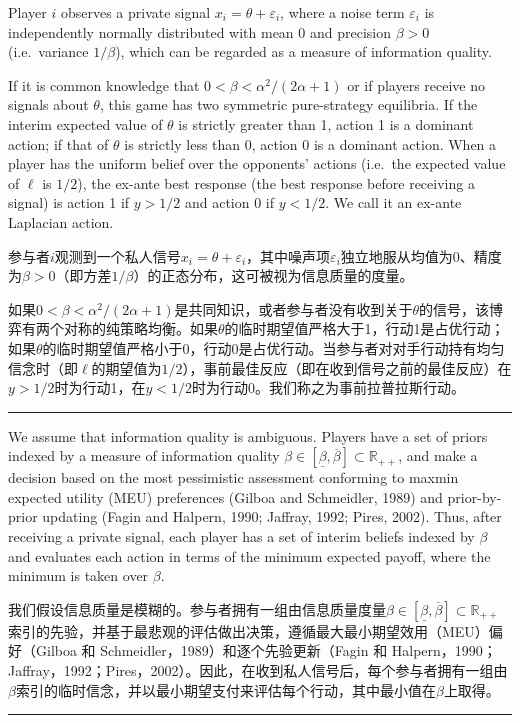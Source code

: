 \documentclass[12pt,a4paper]{article}
\newenvironment{original}
  {\par\medskip\noindent\color{black}\ignorespaces}
  {\par\medskip}
\newenvironment{translation}
  {\par\noindent\color{darkblue}\ignorespaces}
  {\par\medskip\noindent\hrule\par\medskip}
\theoremstyle{definition}
\theoremstyle{remark}
\begin{document}
\begin{original}
Player $i$ observes a private signal $x_i = \theta + \varepsilon_i$, where a noise term $\varepsilon_i$ is independently normally distributed with mean 0 and precision $\beta > 0$ (i.e.\ variance $1/\beta$), which can be regarded as a measure of information quality.

If it is common knowledge that $0 < \beta < \alpha^2/(2\alpha + 1)$ or if players receive no signals about $\theta$, this game has two symmetric pure-strategy equilibria. If the interim expected value of $\theta$ is strictly greater than 1, action 1 is a dominant action; if that of $\theta$ is strictly less than 0, action 0 is a dominant action. When a player has the uniform belief over the opponents' actions (i.e.\ the expected value of $\ell$ is $1/2$), the ex-ante best response (the best response before receiving a signal) is action 1 if $y > 1/2$ and action 0 if $y < 1/2$. We call it an ex-ante Laplacian action.
\end{original}
\begin{translation}
参与者$i$观测到一个私人信号$x_i = \theta + \varepsilon_i$，其中噪声项$\varepsilon_i$独立地服从均值为0、精度为$\beta > 0$（即方差$1/\beta$）的正态分布，这可被视为信息质量的度量。

如果$0 < \beta < \alpha^2/(2\alpha + 1)$是共同知识，或者参与者没有收到关于$\theta$的信号，该博弈有两个对称的纯策略均衡。如果$\theta$的临时期望值严格大于1，行动1是占优行动；如果$\theta$的临时期望值严格小于0，行动0是占优行动。当参与者对对手行动持有均匀信念时（即$\ell$的期望值为$1/2$），事前最佳反应（即在收到信号之前的最佳反应）在$y > 1/2$时为行动1，在$y < 1/2$时为行动0。我们称之为事前拉普拉斯行动。
\end{translation}

\begin{original}
We assume that information quality is ambiguous. Players have a set of priors indexed by a measure of information quality $\beta \in [\underline{\beta}, \overline{\beta}] \subset \mathbb{R}_{++}$, and make a decision based on the most pessimistic assessment conforming to maxmin expected utility (MEU) preferences (Gilboa and Schmeidler, 1989) and prior-by-prior updating (Fagin and Halpern, 1990; Jaffray, 1992; Pires, 2002). Thus, after receiving a private signal, each player has a set of interim beliefs indexed by $\beta$ and evaluates each action in terms of the minimum expected payoff, where the minimum is taken over $\beta$.
\end{original}
\begin{translation}
我们假设信息质量是模糊的。参与者拥有一组由信息质量度量$\beta \in [\underline{\beta}, \overline{\beta}] \subset \mathbb{R}_{++}$索引的先验，并基于最悲观的评估做出决策，遵循最大最小期望效用（MEU）偏好（Gilboa 和 Schmeidler，1989）和逐个先验更新（Fagin 和 Halpern，1990；Jaffray，1992；Pires，2002）。因此，在收到私人信号后，每个参与者拥有一组由$\beta$索引的临时信念，并以最小期望支付来评估每个行动，其中最小值在$\beta$上取得。
\end{translation}
\end{document}
